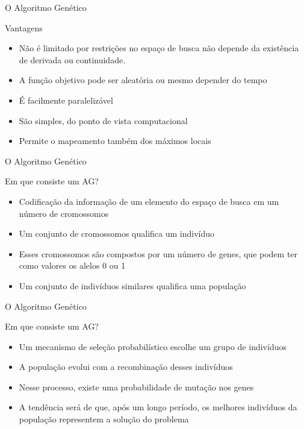 \begin{frame}{O Algoritmo Genético}
  \begin{block}{Vantagens}
    \vfill
    \begin{itemize}
      \item Não é limitado por restrições no espaço de busca\trav
            não depende da existência de derivada ou continuidade.
      \item A função objetivo pode ser aleatória ou mesmo depender do tempo
      \item É facilmente paralelizável
      \item São simples, do ponto de vista computacional
      \item Permite o mapeamento também dos máximos locais
    \end{itemize}
  \end{block}
\end{frame}

\begin{frame}{O Algoritmo Genético}
  \begin{block}{Em que consiste um AG?}
    \vfill
    \begin{itemize}
      \item Codificação da informação de um elemento do espaço de busca
            em um número de cromossomos
      \item Um conjunto de cromossomos qualifica um indivíduo
      \item Esses cromossomos são compostos por um número de genes,
            que podem ter como valores os alelos 0 ou 1
      \item Um conjunto de indivíduos similares qualifica uma população
    \end{itemize}
  \end{block}
\end{frame}

\begin{frame}{O Algoritmo Genético}
  \begin{block}{Em que consiste um AG?}
    \begin{itemize}
      \item Um mecanismo de seleção probabilístico escolhe um grupo
            de indivíduos
      \item A população evolui com a recombinação desses indivíduos
      \item Nesse processo, existe uma probabilidade de mutação nos genes
      \item A tendência será de que, após um longo período, os melhores
            indivíduos da população representem a solução do problema
    \end{itemize}
  \end{block}
\end{frame}

